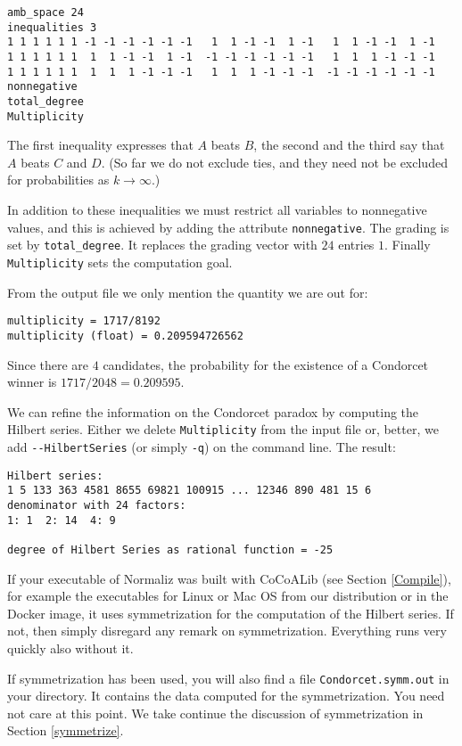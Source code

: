 \documentclass[12pt,a4paper]{scrartcl}
\theoremstyle{definition}
\begin{document}
\begin{Verbatim}
amb_space 24
inequalities 3
1 1 1 1 1 1 -1 -1 -1 -1 -1 -1   1  1 -1 -1  1 -1   1  1 -1 -1  1 -1
1 1 1 1 1 1  1  1 -1 -1  1 -1  -1 -1 -1 -1 -1 -1   1  1  1 -1 -1 -1
1 1 1 1 1 1  1  1  1 -1 -1 -1   1  1  1 -1 -1 -1  -1 -1 -1 -1 -1 -1
nonnegative
total_degree
Multiplicity
\end{Verbatim}
The first inequality expresses that $A$ beats $B$, the second and the third say that $A$ beats $C$ and $D$. (So far we do not exclude ties, and they need not be excluded for probabilities as $k\to\infty$.)

In addition to these inequalities we must restrict all variables to nonnegative values, and this is achieved by adding the attribute \verb|nonnegative|. The grading is set by \verb|total_degree|. It replaces the grading vector with $24$ entries $1$. Finally \verb|Multiplicity| sets the computation goal.

From the output file we only mention the quantity we are out for:
\begin{Verbatim}
multiplicity = 1717/8192
multiplicity (float) = 0.209594726562
\end{Verbatim}
Since there are $4$ candidates, the probability for the existence of a Condorcet winner is $1717/2048=0.209595$.

We can refine the information on the Condorcet paradox by computing the Hilbert series. Either we delete \verb|Multiplicity| from the input file or, better, we add \verb|--HilbertSeries| (or simply \verb|-q|) on the command line. The result:
\begin{Verbatim}
Hilbert series:
1 5 133 363 4581 8655 69821 100915 ... 12346 890 481 15 6 
denominator with 24 factors:
1: 1  2: 14  4: 9

degree of Hilbert Series as rational function = -25
\end{Verbatim}

If your executable of Normaliz was built with CoCoALib (see Section \ref{Compile}), for example the executables for Linux or Mac OS from our distribution or in the Docker image, it uses symmetrization for the computation of the Hilbert series. If not, then simply disregard any remark on symmetrization. Everything runs very quickly also without it.

If symmetrization has been used, you will also find a file \verb|Condorcet.symm.out| in your directory. It contains the data computed for the symmetrization. You need not care at this point. We take continue the discussion of symmetrization in Section \ref{symmetrize}.
\end{document}
